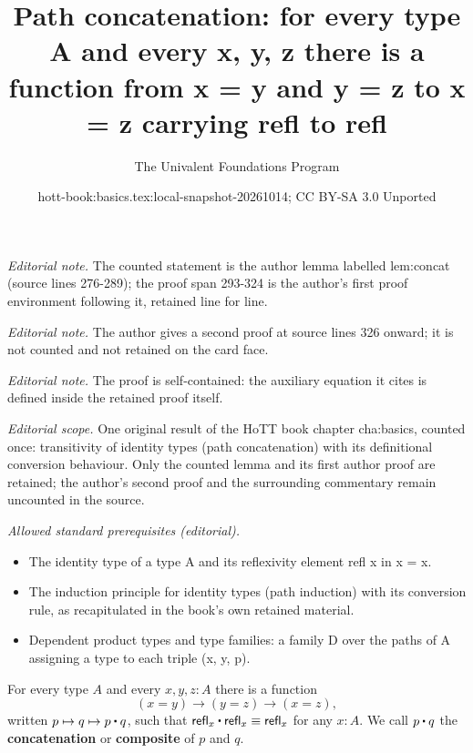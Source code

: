\documentclass[10pt,a4paper]{article}
\title{Path concatenation: for every type A and every x, y, z there is a function from x = y and y = z to x = z carrying refl to refl}
\author{The Univalent Foundations Program}
\date{hott-book:basics.tex:local-snapshot-20261014; CC BY-SA 3.0 Unported}
\newcounter{chapter}
\providecommand{\index}[1]{}
\newcommand{\jdeq}{\equiv}      %
\newcommand{\define}[1]{\textbf{#1}}
\newcommand{\refl}[1]{\ensuremath{\mathsf{refl}_{#1}}\xspace}
\newcommand{\ct}{%
  \mathchoice{\mathbin{\raisebox{0.5ex}{$\displaystyle\centerdot$}}}%
             {\mathbin{\raisebox{0.5ex}{$\centerdot$}}}%
             {\mathbin{\raisebox{0.25ex}{$\scriptstyle\,\centerdot\,$}}}%
             {\mathbin{\raisebox{0.1ex}{$\scriptscriptstyle\,\centerdot\,$}}}
}
\theoremstyle{definition}
\theoremstyle{remark}
\numberwithin{equation}{section}
\newcommand{\indexdef}[1]{\index{#1|defstyle}}   %
\begin{document}
\maketitle
\noindent\textit{Editorial note.} The counted statement is the author lemma labelled lem:concat (source lines 276-289); the proof span 293-324 is the author's first proof environment following it, retained line for line.\par\medskip
\noindent\textit{Editorial note.} The author gives a second proof at source lines 326 onward; it is not counted and not retained on the card face.\par\medskip
\noindent\textit{Editorial note.} The proof is self-contained: the auxiliary equation it cites is defined inside the retained proof itself.\par\medskip
\noindent\textit{Editorial scope.} One original result of the HoTT book chapter cha:basics, counted once: transitivity of identity types (path concatenation) with its definitional conversion behaviour. Only the counted lemma and its first author proof are retained; the author's second proof and the surrounding commentary remain uncounted in the source.\par\medskip
\noindent\textit{Allowed standard prerequisites (editorial).}\begin{itemize}
\item The identity type of a type A and its reflexivity element refl x in x = x.
\item The induction principle for identity types (path induction) with its conversion rule, as recapitulated in the book's own retained material.
\item Dependent product types and type families: a family D over the paths of A assigning a type to each triple (x, y, p).
\end{itemize}\medskip
\begin{lem}\label{lem:concat}
  For every type $A$ and every $x,y,z:A$ there is a function
  \begin{equation*}
  (x= y) \to   (y= z)\to (x=  z),
  \end{equation*}
  written $p \mapsto q \mapsto p\ct q$, such that $\refl{x}\ct \refl{x}\jdeq \refl{x}$ for any $x:A$.
  We call $p\ct q$ the \define{concatenation} or \define{composite} of $p$ and $q$.
  \indexdef{path!concatenation}%
  \indexdef{path!composite}%
  \indexdef{concatenation of paths}%
  \indexdef{composition!of paths}%
  \index{equality!transitivity of}%
  \index{transitivity!of equality}%
\end{lem}
\end{document}
